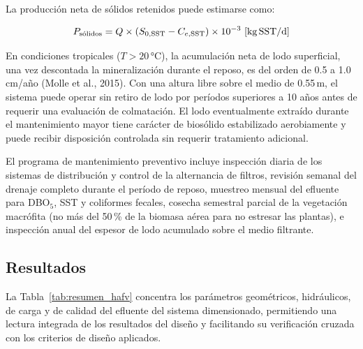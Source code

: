 La producción neta de sólidos retenidos puede estimarse como:

\begin{equation}
P_\text{sólidos} = Q \times (S_{0,\text{SST}} - C_{e,\text{SST}}) \times 10^{-3}\ \text{[kg\,SST/d]}
\end{equation}

En condiciones tropicales ($T > 20$\,°C), la acumulación neta de lodo superficial, una vez descontada la mineralización durante el reposo, es del orden de 0.5 a 1.0\,cm/año (Molle et al., 2015). Con una altura libre sobre el medio de 0.55\,m, el sistema puede operar sin retiro de lodo por períodos superiores a 10 años antes de requerir una evaluación de colmatación. El lodo eventualmente extraído durante el mantenimiento mayor tiene carácter de biosólido estabilizado aerobiamente y puede recibir disposición controlada sin requerir tratamiento adicional.

El programa de mantenimiento preventivo incluye inspección diaria de los sistemas de distribución y control de la alternancia de filtros, revisión semanal del drenaje completo durante el período de reposo, muestreo mensual del efluente para DBO$_5$, SST y coliformes fecales, cosecha semestral parcial de la vegetación macrófita (no más del 50\,\% de la biomasa aérea para no estresar las plantas), e inspección anual del espesor de lodo acumulado sobre el medio filtrante.


\subsection{Resultados}

La Tabla~\ref{tab:resumen_hafv} concentra los parámetros geométricos, hidráulicos, de carga y de calidad del efluente del sistema dimensionado, permitiendo una lectura integrada de los resultados del diseño y facilitando su verificación cruzada con los criterios de diseño aplicados.

